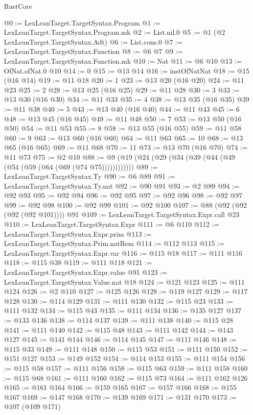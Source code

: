 \begin{lexlean}{RustCore}
\begin{coremodule}
@0 := LexLeanTarget.TargetSyntax.Program
@1 := LexLeanTarget.TargetSyntax.Program.mk
@2 := List.nil.{0}
@5 := @1 (@2 LexLeanTarget.TargetSyntax.Adt)
@6 := List.cons.{0}
@7 := LexLeanTarget.TargetSyntax.Function
@8 := @6 @7
@9 := LexLeanTarget.TargetSyntax.Function.mk
@10 := Nat
@11 := @6 @10
@13 := OfNat.ofNat.{0} @10
@14 := 0
@15 := @13 @14
@16 := instOfNatNat
@18 := @15 (@16 @14)
@19 := @11 @18
@20 := 1
@23 := @13 @20 (@16 @20)
@24 := @11 @23
@25 := 2
@28 := @13 @25 (@16 @25)
@29 := @11 @28
@30 := 3
@33 := @13 @30 (@16 @30)
@34 := @11 @33
@35 := 4
@38 := @13 @35 (@16 @35)
@39 := @11 @38
@40 := 5
@43 := @13 @40 (@16 @40)
@44 := @11 @43
@45 := 6
@48 := @13 @45 (@16 @45)
@49 := @11 @48
@50 := 7
@53 := @13 @50 (@16 @50)
@54 := @11 @53
@55 := 8
@58 := @13 @55 (@16 @55)
@59 := @11 @58
@60 := 9
@63 := @13 @60 (@16 @60)
@64 := @11 @63
@65 := 10
@68 := @13 @65 (@16 @65)
@69 := @11 @68
@70 := 11
@73 := @13 @70 (@16 @70)
@74 := @11 @73
@75 := @2 @10
@88 := @9 (@19 (@24 (@29 (@34 (@39 (@44 (@49 (@54 (@59 (@64 (@69 (@74 @75))))))))))))
@89 := LexLeanTarget.TargetSyntax.Ty
@90 := @6 @89
@91 := LexLeanTarget.TargetSyntax.Ty.nat
@92 := @90 @91
@93 := @2 @89
@94 := @92 @93
@95 := @92 @94
@96 := @92 @95
@97 := @92 @96
@98 := @92 @97
@99 := @92 @98
@100 := @92 @99
@101 := @92 @100
@107 := @88 (@92 (@92 (@92 (@92 @101)))) @91
@109 := LexLeanTarget.TargetSyntax.Expr.call @23
@110 := LexLeanTarget.TargetSyntax.Expr
@111 := @6 @110
@112 := LexLeanTarget.TargetSyntax.Expr.prim
@113 := LexLeanTarget.TargetSyntax.Prim.natRem
@114 := @112 @113
@115 := LexLeanTarget.TargetSyntax.Expr.var
@116 := @115 @18
@117 := @111 @116
@118 := @115 @38
@119 := @111 @118
@121 := LexLeanTarget.TargetSyntax.Expr.value @91
@123 := LexLeanTarget.TargetSyntax.Value.nat @18
@124 := @121 @123
@125 := @111 @124
@126 := @2 @110
@127 := @125 @126
@128 := @119 @127
@129 := @117 @128
@130 := @114 @129
@131 := @111 @130
@132 := @115 @23
@133 := @111 @132
@134 := @115 @43
@135 := @111 @134
@136 := @135 @127
@137 := @133 @136
@138 := @114 @137
@139 := @111 @138
@140 := @115 @28
@141 := @111 @140
@142 := @115 @48
@143 := @111 @142
@144 := @143 @127
@145 := @141 @144
@146 := @114 @145
@147 := @111 @146
@148 := @115 @33
@149 := @111 @148
@150 := @115 @53
@151 := @111 @150
@152 := @151 @127
@153 := @149 @152
@154 := @114 @153
@155 := @111 @154
@156 := @115 @58
@157 := @111 @156
@158 := @115 @63
@159 := @111 @158
@160 := @115 @68
@161 := @111 @160
@162 := @115 @73
@164 := @111 @162 @126
@165 := @161 @164
@166 := @159 @165
@167 := @157 @166
@168 := @155 @167
@169 := @147 @168
@170 := @139 @169
@171 := @131 @170
@173 := @107 (@109 @171)

\end{coremodule}
\end{lexlean}
